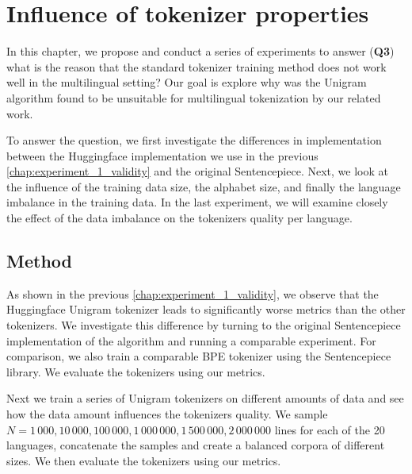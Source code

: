 \chapter{Influence of tokenizer properties}
\label{chap:experiment_2_properties}


In this chapter, we propose and conduct a series of experiments to answer (\textbf{Q3}) what is the reason that the standard tokenizer training method does not work well in the multilingual setting? Our goal is explore why was the Unigram algorithm found to be unsuitable for multilingual tokenization by our related work.

To answer the question, we first investigate the differences in implementation between the Huggingface implementation we use in the previous \autoref{chap:experiment_1_validity} and the original Sentencepiece. Next, we look at the influence of the training data size, the alphabet size, and finally the language imbalance in the training data. In the last experiment, we will examine closely the effect of the data imbalance on the tokenizers quality per language.

\section{Method}

As shown in the previous \autoref{chap:experiment_1_validity}, we observe that the Huggingface Unigram tokenizer leads to significantly worse metrics than the other tokenizers. We investigate this difference by turning to the original Sentencepiece implementation of the algorithm and running a comparable experiment. For comparison, we also train a comparable BPE tokenizer using the Sentencepiece library. We evaluate the tokenizers using our metrics.


Next we train a series of Unigram tokenizers on different amounts of data and see how the data amount influences the tokenizers quality. We sample $N = 1\,000, 10\,000, 100\,000, 1\,000\,000, 1\,500\,000, 2\,000\,000$ lines for each of the 20 languages, concatenate the samples and create a balanced corpora of different sizes. We then evaluate the tokenizers using our metrics.

